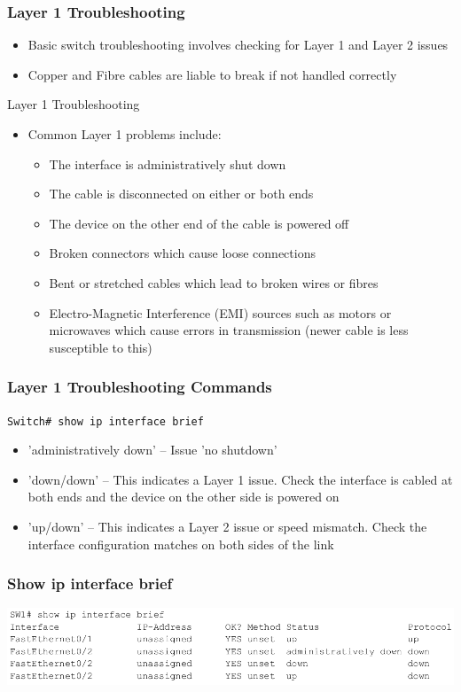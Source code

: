 \documentclass[pdflatex,compress,mathserif]{beamer}
\begin{document}
\begin{frame}
	\frametitle{Layer 1 Troubleshooting}
	\begin{itemize}
		\item Basic switch troubleshooting involves checking for Layer 1 and Layer 2 issues
		\item Copper and Fibre cables are liable to break if not handled correctly
	\end{itemize}
\end{frame}

\begin{frame}{Layer 1 Troubleshooting}
	\begin{itemize}
		\item Common Layer 1 problems include:
		\begin{itemize}
			\item The interface is administratively shut down
			\item The cable is disconnected on either or both ends
			\item The device on the other end of the cable is powered off
			\item Broken connectors which cause loose connections
			\item Bent or stretched cables which lead to broken wires or fibres
			\item Electro-Magnetic Interference (EMI) sources such as motors or microwaves which cause errors in transmission (newer cable is less susceptible to this)
		\end{itemize}
	\end{itemize}
\end{frame}

\begin{frame}
	\frametitle{Layer 1 Troubleshooting Commands}
	\texttt{Switch\# show ip interface brief}
	\begin{itemize}
		\item 'administratively down' – Issue 'no shutdown'
		\item 'down/down' – This indicates a Layer 1 issue. Check the interface is cabled at both ends and the device on the other side is powered on
		\item 'up/down' – This indicates a Layer 2 issue or speed mismatch. Check the interface configuration matches on both sides of the link
	\end{itemize}
\end{frame}

\begin{frame}
	\frametitle{Show ip interface brief}
	\begin{center}
		\includegraphics[width=\linewidth]{img/img03}
	\end{center}
\end{frame}
\end{document}

